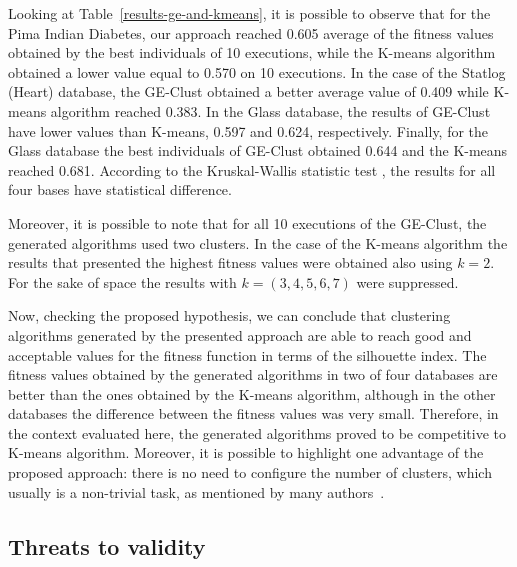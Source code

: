\documentclass[conference]{IEEEtran}
\begin{document}
	
	Looking at Table~\ref{results-ge-and-kmeans}, it is possible to observe that for the Pima Indian Diabetes, our approach reached 0.605 average of the fitness values obtained by the best individuals of 10 executions, while the K-means algorithm obtained a lower value equal to 0.570 on 10 executions. In the case of the Statlog (Heart) database, the GE-Clust obtained a better average value of 0.409 while K-means algorithm reached 0.383. In the Glass database, the results of GE-Clust have lower values than K-means, 0.597 and 0.624, respectively. Finally, for the Glass database the best individuals of GE-Clust obtained 0.644 and the K-means reached 0.681. According to the Kruskal-Wallis statistic test \cite{mckight2010kruskal}, the results for all four bases have statistical difference.
	
	Moreover, it is possible to note that for all 10 executions of the GE-Clust, the generated algorithms used two clusters. In the case of the K-means algorithm the results that presented the highest fitness values were obtained also using $k=2$. For the sake of space the results with $k = (3,4,5,6,7)$ were suppressed.
	
	
	
	
	
	Now, checking the proposed hypothesis, we can conclude that clustering algorithms generated by the presented approach are able to reach good and acceptable values for the fitness function in terms of the silhouette index. The fitness values obtained by the generated algorithms in two of four databases are better than the ones obtained by the K-means algorithm, although in the other databases the difference between the fitness values was very small. Therefore, in the context evaluated here, the generated algorithms proved to be competitive to K-means algorithm. Moreover, it is possible to highlight one advantage of the proposed approach: there is no need to configure the number of clusters, which usually is a non-trivial task, as mentioned by many authors~\cite{tibshirani2001estimating}.
	
	
	\subsection{Threats to validity}
	
\end{document}
